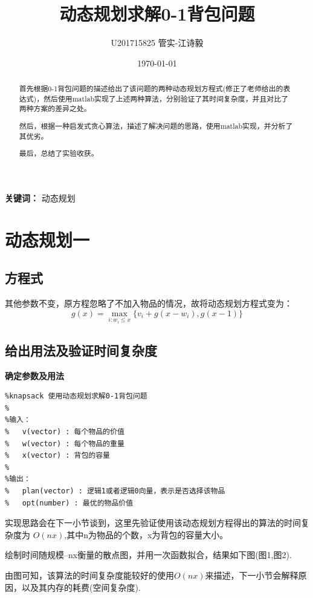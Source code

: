 \documentclass[UTF8]{ctexart}
\title{动态规划求解0-1背包问题}
\author{U201715825 \quad 管实-江诗毅}
\date{\today}
\begin{document}
\maketitle
\tableofcontents

\newpage
\begin{abstract}
	首先根据0-1背包问题的描述给出了该问题的两种动态规划方程式(修正了老师给出的表达式)，然后使用matlab实现了上述两种算法，分别验证了其时间复杂度，并且对比了两种方案的差异之处。
	
	然后，根据一种启发式贪心算法，描述了解决问题的思路，使用matlab实现，并分析了其优劣。
	
	最后，总结了实验收获。
\end{abstract}
\textbf{关键词：} 动态规划
\newpage
\section{动态规划一}
\subsection{方程式}
其他参数不变，原方程忽略了不加入物品的情况，故将动态规划方程式变为：
\[ g(x) = \max_{i:w_i \leq x} \{ v_i + g(x-w_i) , g(x-1) \} \]

\subsection{给出用法及验证时间复杂度}
\textbf{确定参数及用法}
\begin{lstlisting}
%knapsack 使用动态规划求解0-1背包问题
%
%输入：
%   v(vector) : 每个物品的价值
%   w(vector) : 每个物品的重量
%   x(vector) : 背包的容量
%
%输出：
%   plan(vector) : 逻辑1或者逻辑0向量，表示是否选择该物品
%   opt(number) : 最优的物品价值
\end{lstlisting}

实现思路会在下一小节谈到，这里先验证使用该动态规划方程得出的算法的时间复杂度为 \(O(nx)\),其中n为物品的个数，x为背包的容量大小。

绘制时间随规模--nx衡量的散点图，并用一次函数拟合，结果如下图(图1,图2).

由图可知，该算法的时间复杂度能较好的使用\( O(nx) \)来描述，下一小节会解释原因，以及其内存的耗费(空间复杂度).
\end{document}
